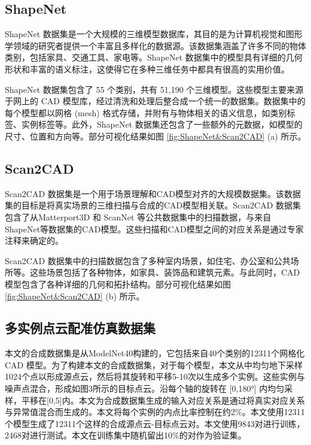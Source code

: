 \subsection{ShapeNet}
ShapeNet 数据集是一个大规模的三维模型数据库，其目的是为计算机视觉和图形学领域的研究者提供一个丰富且多样化的数据源。该数据集涵盖了许多不同的物体类别，包括家具、交通工具、家电等。ShapeNet 数据集中的模型具有详细的几何形状和丰富的语义标注，这使得它在多种三维任务中都具有很高的实用价值。

ShapeNet 数据集包含了 55 个类别，共有 51,190 个三维模型。这些模型主要来源于网上的 CAD 模型库，经过清洗和处理后整合成一个统一的数据集。数据集中的每个模型都以网格 (mesh) 格式存储，并附有与物体相关的语义信息，如类别标签、实例标签等。此外，ShapeNet 数据集还包含了一些额外的元数据，如模型的尺寸、位置和方向等。部分可视化结果如图 \ref{fig:ShapeNet&Scan2CAD} (a) 所示。

\subsection{Scan2CAD}
Scan2CAD 数据集是一个用于场景理解和CAD模型对齐的大规模数据集。该数据集的目标是将真实场景的三维扫描与合成的CAD模型相关联。Scan2CAD 数据集包含了从Matterport3D\cite{chang2017matterport3d} 和 ScanNet\cite{dai2017scannet} 等公共数据集中的扫描数据，与来自ShapeNet等数据集的CAD模型。这些扫描和CAD模型之间的对应关系是通过专家注释来确定的。

Scan2CAD 数据集中的扫描数据包含了多种室内场景，如住宅、办公室和公共场所等。这些场景包括了各种物体，如家具、装饰品和建筑元素。与此同时，CAD模型包含了各种详细的几何和拓扑结构。部分可视化结果如图 \ref{fig:ShapeNet&Scan2CAD} (b) 所示。

\subsection{多实例点云配准仿真数据集}
本文的合成数据集是从ModelNet40构建的，它包括来自40个类别的12311个网格化 CAD 模型。为了构建本文的合成数据集，对于每个模型，本文从中均匀地下采样1024个点以形成源点云，然后将其旋转和平移5-10次以生成多个实例。这些实例与噪声点混合，形成如图3所示的目标点云。沿每个轴的旋转在 [0,180°] 内均匀采样，平移在[0,5]内。本文为合成数据集生成的输入对应关系是通过将真实对应关系与异常值混合而生成的。本文将每个实例的内点比率控制在约2\%。本文使用12311个模型生成了12311个这样的合成源点云-目标点云对。本文使用9843对进行训练，2468对进行测试。本文在训练集中随机留出10\%的对作为验证集。

